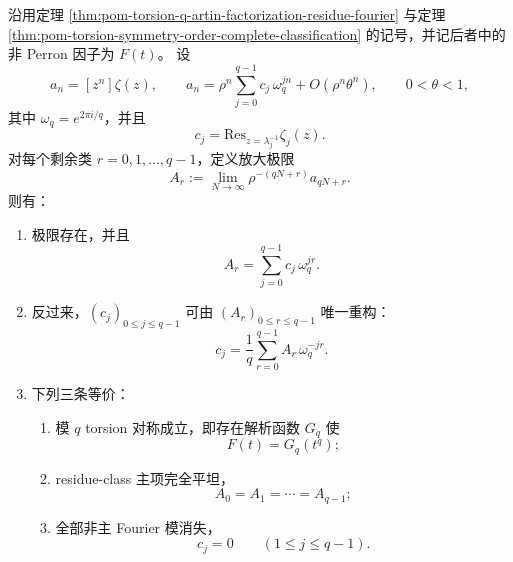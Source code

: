 \begin{theorem}\label{thm:pom-torsion-q-residue-class-fourier-rigidity}
沿用定理 \ref{thm:pom-torsion-q-artin-factorization-residue-fourier} 与定理 \ref{thm:pom-torsion-symmetry-order-complete-classification} 的记号，并记后者中的非 Perron 因子为 \(F(t)\)。
设
\[
a_n=[z^n]\zeta(z),
\qquad
a_n=\rho^n\sum_{j=0}^{q-1}c_j\,\omega_q^{jn}+O(\rho^n\theta^n),
\qquad
0<\theta<1,
\]
其中 \(\omega_q=e^{2\pi i/q}\)，并且
\[
c_j=\mathrm{Res}_{z=\lambda_j^{-1}}\zeta_j(z).
\]
对每个剩余类 \(r=0,1,\dots,q-1\)，定义放大极限
\[
A_r:=\lim_{N\to\infty}\rho^{-(qN+r)}a_{qN+r}.
\]
则有：
\begin{enumerate}
  \item 极限存在，并且
  \[
  \boxed{\;
  A_r=\sum_{j=0}^{q-1}c_j\,\omega_q^{jr}.\;}
  \]
  \item 反过来，\((c_j)_{0\le j\le q-1}\) 可由 \((A_r)_{0\le r\le q-1}\) 唯一重构：
  \[
  \boxed{\;
  c_j=\frac1q\sum_{r=0}^{q-1}A_r\,\omega_q^{-jr}.\;}
  \]
  \item 下列三条等价：
  \begin{enumerate}
    \item 模 \(q\) torsion 对称成立，即存在解析函数 \(G_q\) 使
    \[
    F(t)=G_q(t^q);
    \]
    \item residue-class 主项完全平坦，
    \[
    A_0=A_1=\cdots=A_{q-1};
    \]
    \item 全部非主 Fourier 模消失，
    \[
    c_j=0\qquad(1\le j\le q-1).
    \]
  \end{enumerate}
\end{enumerate}
\end{theorem}
